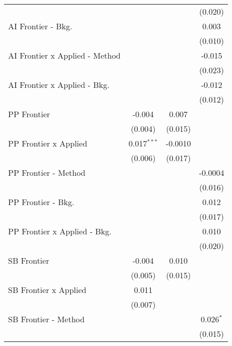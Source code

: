 \begin{tabular}{lccc}
                                  &               &         & (0.020)\\   
   AI Frontier - Bkg.             &               &         & 0.003\\   
                                  &               &         & (0.010)\\   
   AI Frontier x Applied - Method &               &         & -0.015\\   
                                  &               &         & (0.023)\\   
   AI Frontier x Applied - Bkg.   &               &         & -0.012\\   
                                  &               &         & (0.012)\\   
   PP Frontier                    & -0.004        & 0.007   &   \\   
                                  & (0.004)       & (0.015) &   \\   
   PP Frontier x Applied          & 0.017$^{***}$ & -0.0010 &   \\   
                                  & (0.006)       & (0.017) &   \\   
   PP Frontier - Method           &               &         & -0.0004\\   
                                  &               &         & (0.016)\\   
   PP Frontier - Bkg.             &               &         & 0.012\\   
                                  &               &         & (0.017)\\   
   PP Frontier x Applied - Bkg.   &               &         & 0.010\\   
                                  &               &         & (0.020)\\   
   SB Frontier                    & -0.004        & 0.010   &   \\   
                                  & (0.005)       & (0.015) &   \\   
   SB Frontier x Applied          & 0.011         &         &   \\   
                                  & (0.007)       &         &   \\   
   SB Frontier - Method           &               &         & 0.026$^{*}$\\   
                                  &               &         & (0.015)\\   

\end{tabular}
